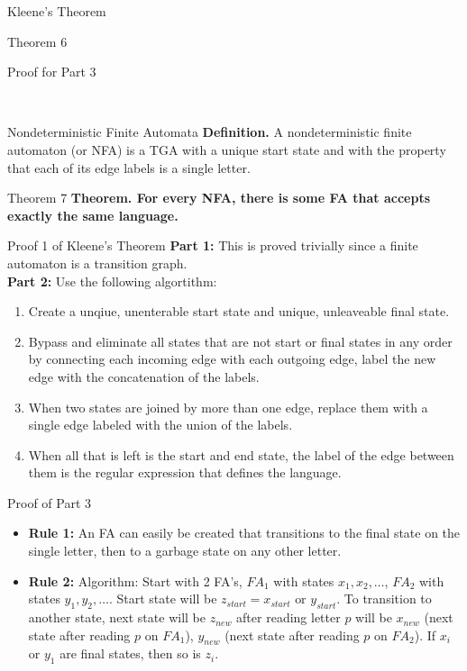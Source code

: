 \documentclass{article}
\begin{document}
\begin{multicols*}{3}
\begin{blackbox}{Kleene's Theorem}
\begin{redbox}{Theorem 6}
\begin{brownbox}{Proof for Part 3}
        \end{brownbox}
    \end{redbox}\\[-2ex]
\end{blackbox}
\begin{blackbox}{Nondeterministic Finite Automata}
    \vspace{1ex}
    \textbf{Definition.} A nondeterministic finite automaton (or NFA) is a TGA with a unique start state and with the property that each of its edge labels is a single letter. 
    \begin{bluebox}{Theorem 7}
        \textbf{Theorem. For every NFA, there is some FA that accepts exactly the same language.}
    \end{bluebox}
    \vspace{-2ex}
\end{blackbox}
\begin{blackbox}{Proof 1 of Kleene's Theorem}
        \textbf{Part 1:} This is proved trivially since a finite automaton is a transition graph.\\
        \textbf{Part 2:} Use the following algortithm: 
        \vspace{-1.5ex}
        \begin{enumerate}[leftmargin=0.5cm, noitemsep]
            \item Create a unqiue, unenterable start state and unique, unleaveable final state.
            \item Bypass and eliminate all states that are not start or final states in any order by connecting each incoming edge with each outgoing edge, label the new edge with the concatenation of the labels.
            \item When two states are joined by more than one edge, replace them with a single edge labeled with the union of the labels.
            \item When all that is left is the start and end state, the label of the edge between them is the regular expression that defines the language.
        \end{enumerate}
    \begin{pinkbox}{Proof of Part 3}
        \begin{itemize}[leftmargin=0.3cm, noitemsep]
            \item \textbf{Rule 1:} An FA can easily be created that transitions to the final state on the single letter, then to a garbage state on any other letter.
            \item \textbf{Rule 2:} Algorithm: Start with 2 FA's, $FA_1$ with states $x_1,x_2,\ldots$, $FA_2$ with states $y_1,y_2,\ldots$. Start state will be $z_{start} = x_{start} \text{ or } y_{start}$. To transition to another state, next state will be $z_{new}$ after reading letter $p$ will be $x_{new}$ (next state after reading $p$ on $FA_1$), $y_{new}$ (next state after reading $p$ on $FA_2$). If $x_i$ or $y_1$ are final states, then so is $z_i$.

\end{itemize}
\end{pinkbox}
\end{blackbox}
\end{multicols*}
\end{document}
